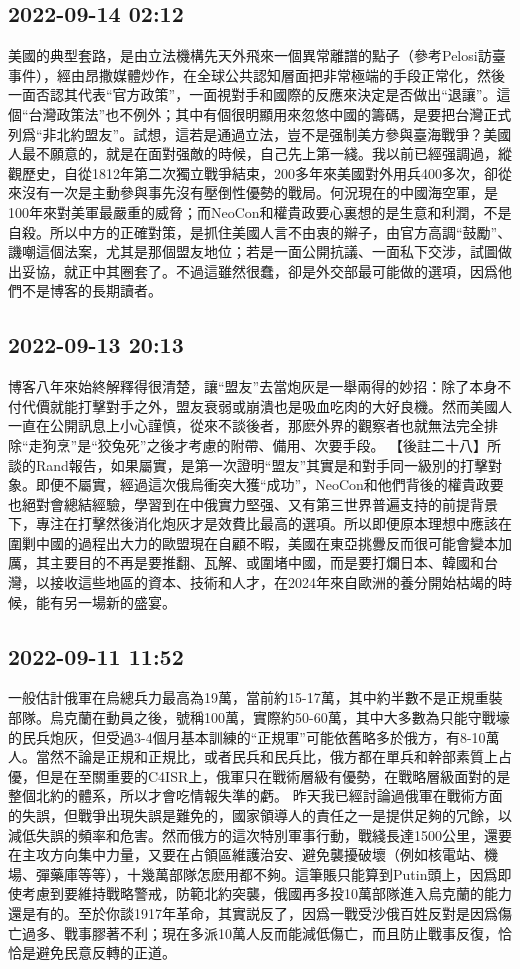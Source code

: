 \documentclass[twocolumn]{ctexart}
\begin{document}
\subsection*{2022-09-14 02:12}

美國的典型套路，是由立法機構先天外飛來一個異常離譜的點子（參考Pelosi訪臺事件），經由昂撒媒體炒作，在全球公共認知層面把非常極端的手段正常化，然後一面否認其代表“官方政策”，一面視對手和國際的反應來決定是否做出“退讓”。這個“台灣政策法”也不例外；其中有個很明顯用來忽悠中國的籌碼，是要把台灣正式列爲“非北約盟友”。試想，這若是通過立法，豈不是强制美方參與臺海戰爭？美國人最不願意的，就是在面對强敵的時候，自己先上第一綫。我以前已經强調過，縱觀歷史，自從1812年第二次獨立戰爭結束，200多年來美國對外用兵400多次，卻從來沒有一次是主動參與事先沒有壓倒性優勢的戰局。何況現在的中國海空軍，是100年來對美軍最嚴重的威脅；而NeoCon和權貴政要心裏想的是生意和利潤，不是自殺。所以中方的正確對策，是抓住美國人言不由衷的辮子，由官方高調“鼓勵”、譏嘲這個法案，尤其是那個盟友地位；若是一面公開抗議、一面私下交涉，試圖做出妥協，就正中其圈套了。不過這雖然很蠢，卻是外交部最可能做的選項，因爲他們不是博客的長期讀者。
\subsection*{2022-09-13 20:13}

博客八年來始終解釋得很清楚，讓“盟友”去當炮灰是一舉兩得的妙招：除了本身不付代價就能打擊對手之外，盟友衰弱或崩潰也是吸血吃肉的大好良機。然而美國人一直在公開訊息上小心謹慎，從來不談後者，那麽外界的觀察者也就無法完全排除“走狗烹”是“狡兔死”之後才考慮的附帶、備用、次要手段。
【後註二十八】所談的Rand報告，如果屬實，是第一次證明“盟友”其實是和對手同一級別的打擊對象。即便不屬實，經過這次俄烏衝突大獲“成功”，NeoCon和他們背後的權貴政要也絕對會總結經驗，學習到在中俄實力堅强、又有第三世界普遍支持的前提背景下，專注在打擊然後消化炮灰才是效費比最高的選項。所以即便原本理想中應該在圍剿中國的過程出大力的歐盟現在自顧不暇，美國在東亞挑釁反而很可能會變本加厲，其主要目的不再是要推翻、瓦解、或圍堵中國，而是要打爛日本、韓國和台灣，以接收這些地區的資本、技術和人才，在2024年來自歐洲的養分開始枯竭的時候，能有另一場新的盛宴。
\subsection*{2022-09-11 11:52}

一般估計俄軍在烏總兵力最高為19萬，當前約15-17萬，其中約半數不是正規重裝部隊。烏克蘭在動員之後，號稱100萬，實際約50-60萬，其中大多數為只能守戰壕的民兵炮灰，但受過3-4個月基本訓練的“正規軍”可能依舊略多於俄方，有8-10萬人。當然不論是正規和正規比，或者民兵和民兵比，俄方都在單兵和幹部素質上占優，但是在至關重要的C4ISR上，俄軍只在戰術層級有優勢，在戰略層級面對的是整個北約的體系，所以才會吃情報失準的虧。
昨天我已經討論過俄軍在戰術方面的失誤，但戰爭出現失誤是難免的，國家領導人的責任之一是提供足夠的冗餘，以減低失誤的頻率和危害。然而俄方的這次特別軍事行動，戰綫長達1500公里，還要在主攻方向集中力量，又要在占領區維護治安、避免襲擾破壞（例如核電站、機場、彈藥庫等等），十幾萬部隊怎麽用都不夠。這筆賬只能算到Putin頭上，因爲即使考慮到要維持戰略警戒，防範北約突襲，俄國再多投10萬部隊進入烏克蘭的能力還是有的。至於你談1917年革命，其實説反了，因爲一戰受沙俄百姓反對是因爲傷亡過多、戰事膠著不利；現在多派10萬人反而能減低傷亡，而且防止戰事反復，恰恰是避免民意反轉的正道。
\end{document}
